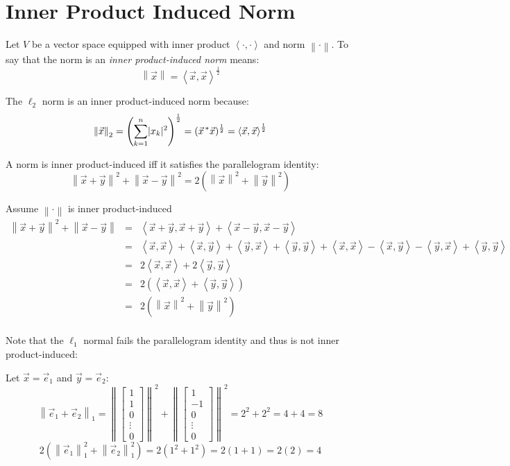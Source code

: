 \documentclass[letterpaper,12pt,fleqn]{article}
\newcommand{\inner}[2]{\left<#1,#2\right>}
\newcommand{\norm}[1]{\left\lVert#1\right\rVert}
\newcommand{\vx}{\vec{x}}
\newcommand{\vy}{\vec{y}}
\newcommand{\ve}{\vec{e}}
\begin{document}
\section*{Inner Product Induced Norm}

\begin{definition}
  Let $V$ be a vector space equipped with inner product $\inner{\cdot}{\cdot}$
  and norm $\norm{\cdot}$. To say that the norm is an
  \emph{inner product-induced norm} means:
  \[\norm{\vx}=\inner{\vx}{\vx}^{\frac{1}{2}}\]
\end{definition}

\begin{example}
  The $\ell_2$ norm is an inner product-induced norm because:
  \[\norm{\vx}_2=\left(\sum_{k=1}^n\abs{x_k}^2\right)^{\frac{1}{2}}=
  (\vx^{\,*}\vx)^{\frac{1}{2}}=\inner{\vx}{\vx}^{\frac{1}{2}}\]
\end{example}

\begin{theorem}
  A norm is inner product-induced iff it satisfies the parallelogram identity:
  \[\norm{\vx+\vy}^2+\norm{\vx-\vy}^2=2(\norm{\vx}^2+\norm{\vy}^2)\]
\end{theorem}

\begin{theproof}
  \listbreak
  \begin{description}
  \item Assume $\norm{\cdot}$ is inner product-induced
    \begin{eqnarray*}
      \norm{\vx+\vy}^2+\norm{\vx-\vy} &=&
      \inner{\vx+\vy}{\vx+\vy}+\inner{\vx-\vy}{\vx-\vy} \\
      &=& \inner{\vx}{\vx}+\inner{\vx}{\vy}+\inner{\vy}{\vx}+\inner{\vy}{\vy}+
      \inner{\vx}{\vx}-\inner{\vx}{\vy}-\inner{\vy}{\vx}+\inner{\vy}{\vy} \\
      &=& 2\inner{\vx}{\vx}+2\inner{\vy}{\vy} \\
      &=& 2(\inner{\vx}{\vx}+\inner{\vy}{\vy}) \\
      &=& 2(\norm{\vx}^2+\norm{\vy}^2) \\
    \end{eqnarray*}
  \end{description}
\end{theproof}

Note that the $\ell_1$ normal fails the parallelogram identity and thus is not
inner product-induced:

Let $\vx=\ve_1$ and $\vy=\ve_2$:
\[\norm{\ve_1+\ve_2}_1=
\norm{\begin{bmatrix} 1 \\ 1 \\ 0 \\ \vdots \\ 0 \end{bmatrix}}^2+
\norm{\begin{bmatrix} 1 \\ -1 \\ 0 \\ \vdots \\ 0 \end{bmatrix}}^2=
2^2+2^2=4+4=8\]
\[2(\norm{\ve_1}_1^2+\norm{\ve_2}_1^2)=2(1^2+1^2)=2(1+1)=2(2)=4\]
\end{document}
